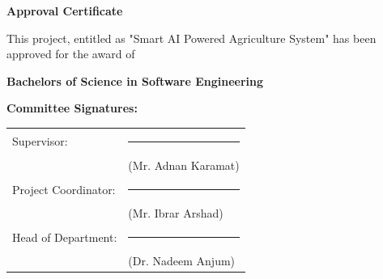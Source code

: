 
\begin{center}

  \vspace*{0.5cm} 
  {\centering
      {\fontsize{16pt}{20pt}\selectfont \textbf{Approval Certificate} \par}
  }
  \vspace{1cm}

  { \fontsize{14pt}{18pt}\selectfont
  This project, entitled as "Smart AI Powered Agriculture System" has been approved for the award of
  }

  \vspace{1cm}

  {\fontsize{16pt}{20pt}\selectfont \textbf{Bachelors of Science in Software Engineering}} \par
\end{center}

\vspace{1cm}

\noindent
{\fontsize{14pt}{18pt}\selectfont \textbf{Committee Signatures:}}
\vspace{1.4cm}

\noindent
{\fontsize{14pt}{18pt}\selectfont
\begin{tabularx}{\textwidth}{@{}p{6cm} X@{}}
  Supervisor: & \hfill \rule{6cm}{0.4pt} \\ 
              & \hfill (Mr. Adnan Karamat) \\[1.8cm]

  Project Coordinator: & \hfill \rule{6cm}{0.4pt} \\ 
                       & \hfill (Mr. Ibrar Arshad) \\[1.8cm]

  Head of Department: & \hfill \rule{6cm}{0.4pt} \\ 
                      & \hfill (Dr. Nadeem Anjum) \\
\end{tabularx}
}